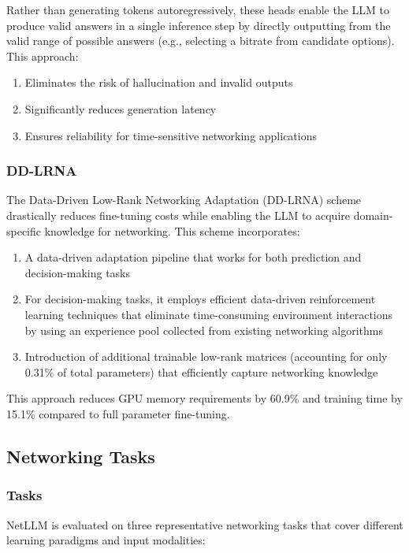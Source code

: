 \documentclass[twocolumn]{article}
\begin{document}
Rather than generating tokens autoregressively, these heads enable the LLM to produce valid answers in a single inference step by directly outputting from the valid range of possible answers (e.g., selecting a bitrate from candidate options). This approach:

\begin{enumerate}[itemsep=0pt, topsep=2pt, parsep=0pt]
  \item Eliminates the risk of hallucination and invalid outputs
  \item Significantly reduces generation latency
  \item Ensures reliability for time-sensitive networking applications
\end{enumerate}

\subsubsection{DD-LRNA}
The Data-Driven Low-Rank Networking Adaptation (DD-LRNA) scheme drastically reduces fine-tuning costs while enabling the LLM to acquire domain-specific knowledge for networking. This scheme incorporates:

\begin{enumerate}[itemsep=0pt, topsep=2pt, parsep=0pt]
  \item A data-driven adaptation pipeline that works for both prediction and decision-making tasks
  \item For decision-making tasks, it employs efficient data-driven reinforcement learning techniques that eliminate time-consuming environment interactions by using an experience pool collected from existing networking algorithms
  \item Introduction of additional trainable low-rank matrices (accounting for only 0.31\% of total parameters) that efficiently capture networking knowledge
\end{enumerate}

This approach reduces GPU memory requirements by 60.9\% and training time by 15.1\% compared to full parameter fine-tuning.

\subsection{Networking Tasks}

\subsubsection{Tasks}
NetLLM is evaluated on three representative networking tasks that cover different learning paradigms and input modalities:
\end{document}
